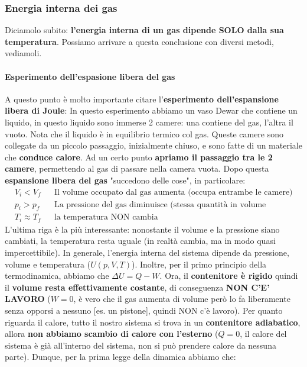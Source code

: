             \subsubsection{Energia interna dei gas}
                Diciamolo subito: \textbf{l'energia interna di un gas dipende SOLO dalla sua temperatura}. Possiamo arrivare a questa conclusione con diversi metodi, vediamoli.
                \paragraph{Esperimento dell'espasione libera del gas}
                    A questo punto è molto importante citare l'\textbf{esperimento dell'espansione libera di Joule}:
                    In questo esperimento abbiamo un vaso Dewar che contiene un liquido, in questo liquido sono immerse 2 camere: una contiene del gas, l'altra il vuoto. Nota che il liquido è in equilibrio termico col gas. Queste camere sono collegate da un piccolo passaggio, inizialmente chiuso, e sono fatte di un materiale che \textbf{conduce calore}. Ad un certo punto \textbf{apriamo il passaggio tra le 2 camere}, permettendo al gas di passare nella camera vuota. Dopo questa \textbf{espansione libera del gas} "succedono delle cose", in particolare:
                    \begin{align*}
                        & V_i < V_f && \textrm{Il volume occupato dal gas aumenta (occupa entrambe le camere)}\\
                        & p_i > p_f && \textrm{La pressione del gas diminuisce (stessa quantità in volume maggiore)}\\
                        & T_i \approx T_f && \textrm{la temperatura NON cambia}
                    \end{align*}
                    L'ultima riga è la più interessante: nonostante il volume e la pressione siano cambiati, la temperatura resta uguale (in realtà cambia, ma in modo quasi impercettibile). In generale, l'energia interna del sistema dipende da pressione, volume e temperatura ($U(p, V, T)$). Inoltre, per il primo principio della termodinamica, abbiamo che $\Delta U = Q - W$. Ora, il \textbf{contenitore è rigido}  quindi il \textbf{volume resta effettivamente costante}, di conseguenza \textbf{NON C'E' LAVORO} ($W=0$, è vero che il gas aumenta di volume però lo fa liberamente senza opporsi a nessuno [es. un pistone], quindi NON c'è lavoro). Per quanto riguarda il calore, tutto il nostro sistema si trova in un \textbf{contenitore adiabatico}, allora \textbf{non abbiamo scambio di calore con l'esterno} ($Q=0$, il calore del sistema è già all'interno del sistema, non si può prendere calore da nessuna parte). Dunque, per la prima legge della dinamica abbiamo che:
